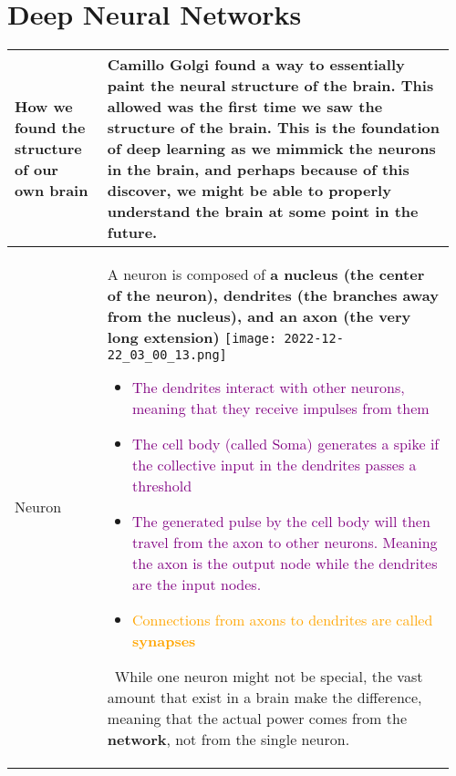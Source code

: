 \documentclass[main.tex,fontsize=8pt,paper=a4,paper=portrait,DIV=calc,]{scrartcl}
\begin{document}
\begin{table}[ht!]
\section{Deep Neural Networks}
\begin{tabular}{|m{0.2\linewidth}|m{0.755\linewidth}|}
\hline
How we found the structure of our own brain & 
\textbf{Camillo Golgi} found a way to essentially paint the neural structure of the brain. This allowed was the first time we saw the structure of the brain. 
This is the foundation of deep learning as we mimmick the neurons in the brain, and perhaps because of this discover, we might be able to properly understand the brain at some point in the future.
\\
\hline
Neuron & 
A neuron is composed of \textbf{a nucleus (the center of the neuron), dendrites (the branches away from the nucleus), and an axon (the very long extension)}\newline
\texttt{[image: 2022-12-22\_03\_00\_13.png]}\newline
\begin{itemize}
\item \textcolor{purple}{The dendrites interact with other neurons, meaning that they receive impulses from them}
\item \textcolor{purple}{The cell body (called Soma) generates a spike if the collective input in the dendrites passes a threshold}
\item \textcolor{purple}{The generated pulse by the cell body will then travel from the axon to other neurons. Meaning the axon is the output node while the dendrites are the input nodes.}
\item \textcolor{orange}{Connections from axons to dendrites are called \textbf{synapses}}
\end{itemize}
\, \newline
\textcolor{OliveGreen}{While one neuron might not be special, the vast amount that exist in a brain make the difference, meaning that the actual power comes from the \textbf{network}, not from the single neuron.}
\\
\hline
\end{tabular}
\end{table}
\pagebreak
\end{document}
